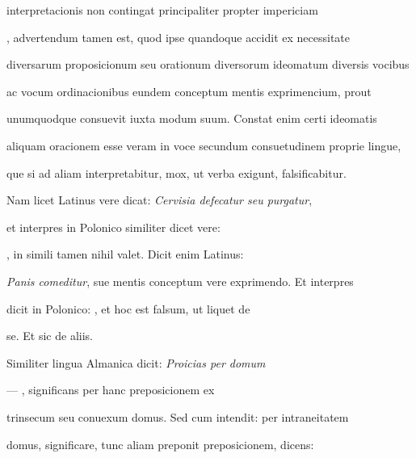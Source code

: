 \begin{VerbatimLatin}[firstnumber=43]
interpretacionis non contingat principaliter propter impericiam 

, advertendum tamen est, quod ipse quandoque accidit ex necessitate

diversarum proposicionum seu orationum diversorum ideomatum diversis vocibus

ac vocum ordinacionibus eundem conceptum mentis exprimencium, prout

unumquodque consuevit iuxta modum suum. Constat enim certi ideomatis

aliquam oracionem esse veram in voce secundum consuetudinem proprie lingue,

que si ad aliam interpretabitur, mox, ut verba exigunt, falsificabitur.

\indentK Nam licet Latinus vere dicat: \textit{Cervisia defecatur seu purgatur}, 

et interpres in Polonico similiter dicet vere:   

   , in simili tamen nihil valet. Dicit enim Latinus:

\textit{Panis comeditur}, sue mentis conceptum vere exprimendo. Et interpres

dicit in Polonico:   , et hoc est falsum, ut liquet de
\end{VerbatimLatin}

\renewcommand{\theFancyVerbLine}{\textcolor{green}{04-55\alph{FancyVerbLine}}}
\begin{VerbatimLatin}[firstnumber=1]
se. Et sic de aliis.

\indentK Similiter lingua Almanica dicit: \textit{Proicias per domum}
\end{VerbatimLatin}

\renewcommand{\theFancyVerbLine}{04-\arabic{FancyVerbLine}\phantom{a}}

\begin{VerbatimLatin}[firstnumber=56]
— , significans per hanc preposicionem  ex

trinsecum seu conuexum domus. Sed cum intendit: per intraneitatem

domus, significare, tunc aliam preponit preposicionem, dicens: 

\end{VerbatimLatin}


